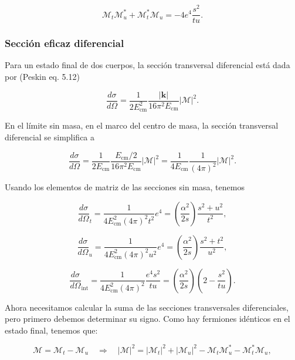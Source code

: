 \begin{equation}
\mathcal{M}_t \mathcal{M}_u^* + \mathcal{M}_t^* \mathcal{M}_u = -4e^4 \frac{s^2}{tu}.
\end{equation}

\subsubsection{Sección eficaz diferencial}
Para un estado final de dos cuerpos, la sección transversal diferencial está dada por (Peskin eq. 5.12)

\begin{equation}
\frac{d\sigma}{d\Omega} = \frac{1}{2E_{\text{cm}}^2} \frac{|\mathbf{k}|}{16\pi^2 E_{\text{cm}}} |\mathcal{M}|^2.
\end{equation}

En el límite sin masa, en el marco del centro de masa, la sección transversal diferencial se simplifica a

\begin{equation}
\frac{d\sigma}{d\Omega} = \frac{1}{2E_{\text{cm}}} \frac{E_{\text{cm}}/2}{16\pi^2 E_{\text{cm}}} |\mathcal{M}|^2 = \frac{1}{4E_{\text{cm}}} \frac{1}{(4\pi)^2} |\mathcal{M}|^2.
\end{equation}

Usando los elementos de matriz de las secciones sin masa, tenemos

\begin{equation}
\frac{d\sigma}{d\Omega}_t = \frac{1}{4E_{\text{cm}}^2 (4\pi)^2 t^2} e^4 = \left( \frac{\alpha^2}{2s} \right) \frac{s^2 + u^2}{t^2},
\end{equation}

\begin{equation}
\frac{d\sigma}{d\Omega}_u = \frac{1}{4E_{\text{cm}}^2 (4\pi)^2 u^2} e^4 = \left( \frac{\alpha^2}{2s} \right) \frac{s^2 + t^2}{u^2},
\end{equation}

\begin{equation}
\frac{d\sigma}{d\Omega}_{\text{int}} = \frac{1}{4E_{\text{cm}}^2 (4\pi)^2} \frac{e^4 s^2}{tu} = \left( \frac{\alpha^2}{2s} \right) \left( 2 - \frac{s^2}{tu} \right).
\end{equation}

Ahora necesitamos calcular la suma de las secciones transversales diferenciales, pero primero debemos determinar su signo. Como hay fermiones idénticos en el estado final, tenemos que:

\begin{equation}
\mathcal{M} = \mathcal{M}_t - \mathcal{M}_u \quad \Rightarrow \quad |\mathcal{M}|^2 = |\mathcal{M}_t|^2 + |\mathcal{M}_u|^2 - \mathcal{M}_t \mathcal{M}_u^* - \mathcal{M}_t^* \mathcal{M}_u,
\end{equation}

